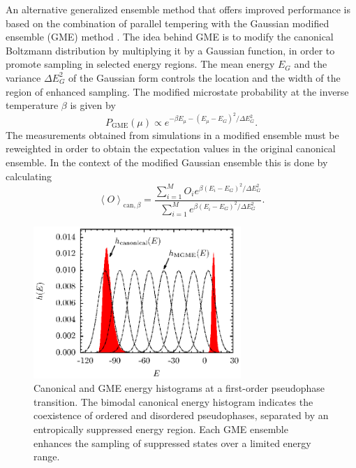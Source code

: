 \documentclass[12pt]{report}
\begin{document}
An alternative generalized ensemble method that offers improved performance is based on the combination of parallel tempering with the Gaussian modified ensemble (GME) method \cite{Neuhaus2006}. The idea behind GME is to modify the canonical Boltzmann distribution by multiplying it by a Gaussian function, in order to promote sampling in selected energy regions. The mean energy $E_{G}$ and the variance $\Delta E_{G}^{2}$ of the Gaussian form controls the location and the width of the region of enhanced sampling. The modified microstate probability at the inverse temperature $\beta$ is given by
%
\begin{equation}
P_{\mathrm{GME}}(\mu) \propto e^{-\beta E_{\mu} -
\left(E_{\mu} - E_{G}\right)^{2} / \Delta E_{G}^{2}}.
\end{equation}
% 
The measurements obtained from simulations in a modified ensemble must be reweighted in order to obtain the expectation values in the original canonical ensemble. In the context of the modified Gaussian ensemble this is done by calculating
\begin{equation}
\left\langle O \right\rangle_{\mathrm{can},\beta} = \frac{\displaystyle \sum_{i=1}^{M} O_{i}e^{\beta 
\left(E_{i} - E_{G}\right)^{2} / \Delta E_{G}^{2}}}{\displaystyle \sum_{i=1}^{M} e^{\beta 
\left(E_{i} - E_{G}\right)^{2} / \Delta E_{G}^{2}}}.
\end{equation} 
%
\begin{figure}
\center
\includegraphics[width = 0.7\textwidth]{chapter3Figs/mgme.eps}
\caption{\label{fig:MGME}%
Canonical and GME energy histograms at a first-order pseudophase transition. The bimodal canonical energy histogram indicates the coexistence of ordered and disordered pseudophases, separated by an entropically suppressed energy region. Each GME ensemble enhances the sampling of suppressed states over a limited energy range.}
\end{figure} 
% 
\end{document}
